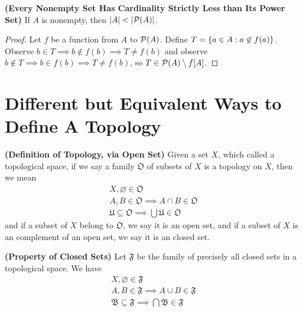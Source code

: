 \documentclass{report}
\begin{document}
\begin{theorem}
\label{2.4.19}
\textbf{(Every Nonempty Set Has Cardinality Strictly Less than Its Power Set)} If $A$ is nonempty, then  $\abso{A}<\abso{\power{A}}$.
\end{theorem}
\begin{proof}
Let $f$ be a function from $A$ to  $\mathcal{P}(A)$. Define $T=\{ a\in A:a\not\in f(a) \}$. Observe $b \in T\implies b\not\in f(b)\implies T\neq f(b)$ and observe $b\not\in T\implies b\in f(b)\implies T\neq f(b)$, so $T\in \mathcal{P}(A)\setminus f[A]$.  
\end{proof}
\section{Different but Equivalent Ways to Define A Topology}
\begin{definition}
\label{2.5.1}
\textbf{(Definition of Topology, via Open Set)} Given a set $X$, which called a topological space, if we say a family $\mathfrak{O}$  of subsets of $X$ is a topology on $X$, then we mean
\begin{gather}
X, \varnothing \in \mathfrak{O}\\
A,B\in\mathfrak{O}\implies A\cap B\in\mathfrak{O}\\
\mathfrak{U}\subseteq \mathfrak{O}\implies \bigcup \mathfrak{U}\in \mathfrak{O}
\end{gather}
and if a subset of $X$ belong to  $\mathfrak{O}$, we say it is an open set, and if a subset of $X$ is an complement of an open set, we say it is an closed set.
\end{definition}
\begin{theorem}
\label{2.5.2}
\textbf{(Property of Closed Sets)} Let $\mathfrak{F}$ be the family of precisely all closed sets in a topological space. We have
\begin{gather}
X,\varnothing \in \mathfrak{F}\\
A,B\in\mathfrak{F}\implies A\cup  B\in\mathfrak{F}\\
\mathfrak{B}\subseteq \mathfrak{F}\implies \bigcap \mathfrak{B}\in \mathfrak{F}
\end{gather}
\end{theorem}
\end{document}
